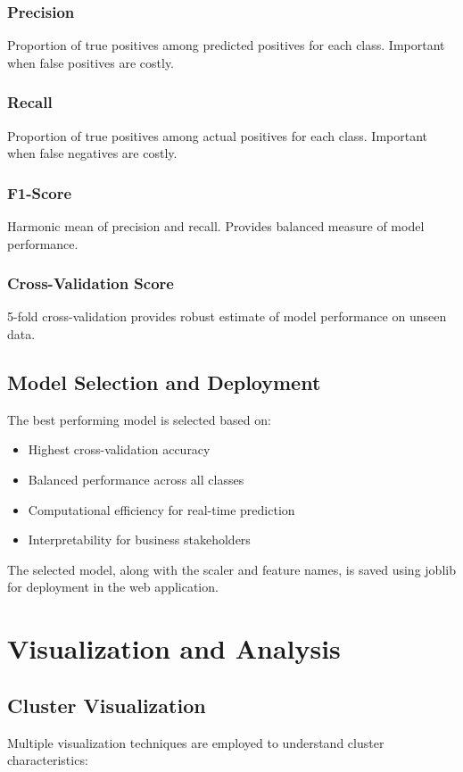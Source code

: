 \documentclass[12pt,a4paper]{report}
\begin{document}
\subsubsection{Precision}
Proportion of true positives among predicted positives for each class. Important when false positives are costly.

\subsubsection{Recall}
Proportion of true positives among actual positives for each class. Important when false negatives are costly.

\subsubsection{F1-Score}
Harmonic mean of precision and recall. Provides balanced measure of model performance.

\subsubsection{Cross-Validation Score}
5-fold cross-validation provides robust estimate of model performance on unseen data.

\subsection{Model Selection and Deployment}
\noindent The best performing model is selected based on:
\begin{itemize}
    \item Highest cross-validation accuracy
    \item Balanced performance across all classes
    \item Computational efficiency for real-time prediction
    \item Interpretability for business stakeholders
\end{itemize}

\noindent The selected model, along with the scaler and feature names, is saved using joblib for deployment in the web application.

\section{Visualization and Analysis}

\subsection{Cluster Visualization}
\noindent Multiple visualization techniques are employed to understand cluster characteristics:
\end{document}
